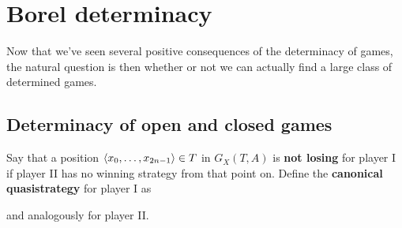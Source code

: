 \chapter{Borel determinacy}
\thispagestyle{fancy}
\label{ch2}

Now that we've seen several positive consequences of the determinacy of games, the natural question is then whether or not we can actually find a large class of determined games.

\section{Determinacy of open and closed games}


Say that a position $\langle x_0,\hdots,x_{2n-1}\rangle\in T$ in $G_X(T,A)$ is \textbf{not losing} for player I if player II has no winning strategy from that point on. Define the \textbf{canonical quasistrategy} for player I as

and analogously for player II.

